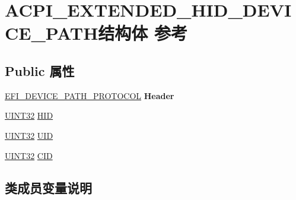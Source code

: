 \hypertarget{struct_a_c_p_i___e_x_t_e_n_d_e_d___h_i_d___d_e_v_i_c_e___p_a_t_h}{}\section{A\+C\+P\+I\+\_\+\+E\+X\+T\+E\+N\+D\+E\+D\+\_\+\+H\+I\+D\+\_\+\+D\+E\+V\+I\+C\+E\+\_\+\+P\+A\+T\+H结构体 参考}
\label{struct_a_c_p_i___e_x_t_e_n_d_e_d___h_i_d___d_e_v_i_c_e___p_a_t_h}
\subsection*{Public 属性}
\begin{DoxyCompactItemize}
\item 
\mbox{\label{struct_a_c_p_i___e_x_t_e_n_d_e_d___h_i_d___d_e_v_i_c_e___p_a_t_h_a1c07b2a13792ffed277767336e0256d5}} 
\hyperlink{struct_e_f_i___d_e_v_i_c_e___p_a_t_h___p_r_o_t_o_c_o_l}{E\+F\+I\+\_\+\+D\+E\+V\+I\+C\+E\+\_\+\+P\+A\+T\+H\+\_\+\+P\+R\+O\+T\+O\+C\+OL} {\bfseries Header}
\item 
\hyperlink{_processor_bind_8h_ae1e6edbbc26d6fbc71a90190d0266018}{U\+I\+N\+T32} \hyperlink{struct_a_c_p_i___e_x_t_e_n_d_e_d___h_i_d___d_e_v_i_c_e___p_a_t_h_aef29df0c1ea44a93d5cb1bf55965f18d}{H\+ID}
\item 
\hyperlink{_processor_bind_8h_ae1e6edbbc26d6fbc71a90190d0266018}{U\+I\+N\+T32} \hyperlink{struct_a_c_p_i___e_x_t_e_n_d_e_d___h_i_d___d_e_v_i_c_e___p_a_t_h_ad6eb2bac124286f0d7054fd4377937be}{U\+ID}
\item 
\hyperlink{_processor_bind_8h_ae1e6edbbc26d6fbc71a90190d0266018}{U\+I\+N\+T32} \hyperlink{struct_a_c_p_i___e_x_t_e_n_d_e_d___h_i_d___d_e_v_i_c_e___p_a_t_h_ad4c20bdb73a483710a5f39d965504d7a}{C\+ID}
\end{DoxyCompactItemize}


\subsection{类成员变量说明}
\mbox{\label{struct_a_c_p_i___e_x_t_e_n_d_e_d___h_i_d___d_e_v_i_c_e___p_a_t_h_ad4c20bdb73a483710a5f39d965504d7a}} 
